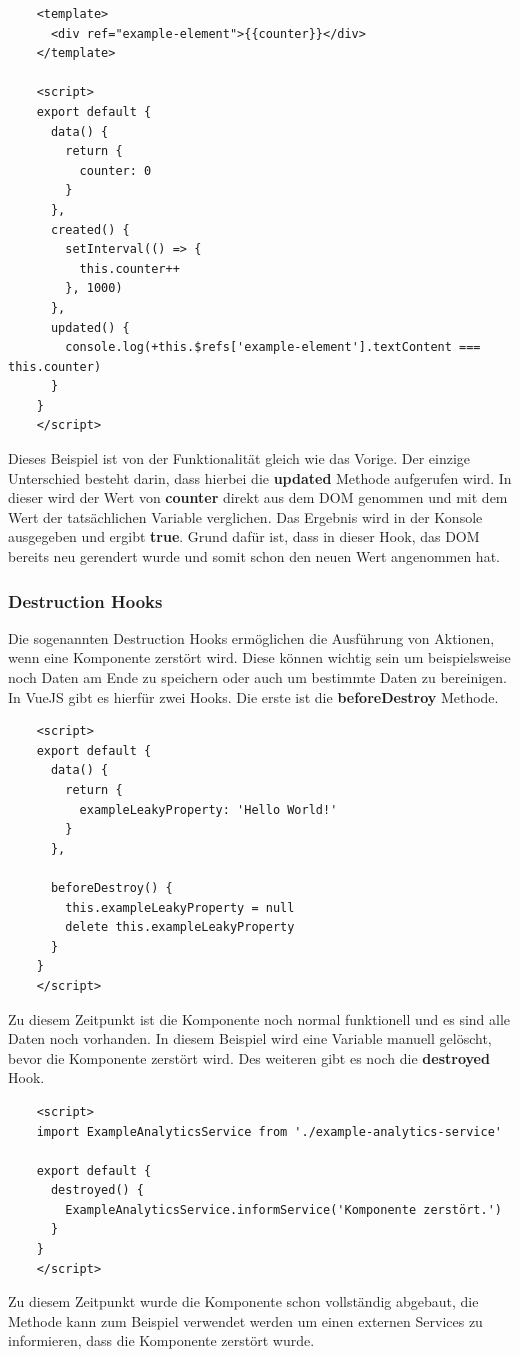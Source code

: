 \begin{lstlisting}
    <template>
      <div ref="example-element">{{counter}}</div>
    </template>
    
    <script>
    export default {
      data() {
        return {
          counter: 0
        }
      },
      created() {
        setInterval(() => {
          this.counter++
        }, 1000)
      },
      updated() {
        console.log(+this.$refs['example-element'].textContent === this.counter)
      }
    }
    </script>
\end{lstlisting}

Dieses Beispiel ist von der Funktionalität gleich wie das Vorige. Der einzige Unterschied besteht darin, dass hierbei die \textbf{updated} Methode aufgerufen wird. In dieser wird der Wert von \textbf{counter} direkt aus dem DOM genommen und mit dem Wert der tatsächlichen Variable verglichen. Das Ergebnis wird in der Konsole ausgegeben und ergibt \textbf{true}. Grund dafür ist, dass in dieser Hook, das DOM bereits neu gerendert wurde und somit schon den neuen Wert angenommen hat.
\cite{frontend_web_vuejs_lifecycle}

\subsubsection{Destruction Hooks}
Die sogenannten Destruction Hooks ermöglichen die Ausführung von Aktionen, wenn eine Komponente zerstört wird. Diese können wichtig sein um beispielsweise noch Daten am Ende zu speichern oder auch um bestimmte Daten zu bereinigen.
In VueJS gibt es hierfür zwei Hooks. Die erste ist die \textbf{beforeDestroy} Methode.

\begin{lstlisting}
    <script>
    export default {
      data() {
        return {
          exampleLeakyProperty: 'Hello World!'
        }
      },
    
      beforeDestroy() {
        this.exampleLeakyProperty = null
        delete this.exampleLeakyProperty
      }
    }
    </script>
\end{lstlisting}

Zu diesem Zeitpunkt ist die Komponente noch normal funktionell und es sind alle Daten noch vorhanden. In diesem Beispiel wird eine Variable manuell gelöscht, bevor die Komponente zerstört wird.
\newpage
Des weiteren gibt es noch die \textbf{destroyed} Hook.

\begin{lstlisting}
    <script>
    import ExampleAnalyticsService from './example-analytics-service'
    
    export default {
      destroyed() {
        ExampleAnalyticsService.informService('Komponente zerstört.')
      }
    }
    </script>
\end{lstlisting}

Zu diesem Zeitpunkt wurde die Komponente schon vollständig abgebaut,  die Methode kann zum Beispiel verwendet werden um einen externen Services zu informieren, dass die Komponente zerstört wurde.

\cite{frontend_web_vuejs_lifecycle}
